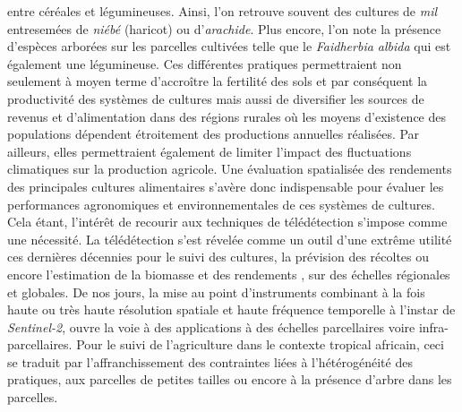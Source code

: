 entre céréales et légumineuses. Ainsi, l'on retrouve souvent des cultures de \emph{mil} entresemées de \emph{niébé} (haricot) ou d'\emph{arachide}. Plus encore, l'on note la 
présence d'espèces arborées sur les parcelles cultivées telle que le \emph{Faidherbia albida} qui est également une légumineuse. Ces différentes pratiques permettraient non seulement à moyen terme d’accroître la fertilité des 
sols et par conséquent la productivité des systèmes de cultures mais aussi de diversifier les sources de revenus et d’alimentation dans des régions rurales où les moyens d’existence
des populations dépendent étroitement des productions annuelles réalisées. Par ailleurs, elles permettraient également de limiter l’impact des fluctuations climatiques sur la 
production agricole. Une évaluation spatialisée des rendements des principales cultures alimentaires s'avère donc indispensable pour évaluer les performances agronomiques et 
environnementales de ces systèmes de cultures. Cela étant, l’intérêt de recourir aux techniques de télédétection s’impose comme une nécessité. La télédétection s’est révelée comme un outil d’une extrême utilité ces dernières décennies pour le suivi des cultures, la prévision des récoltes ou encore l'estimation de la biomasse et des rendements \citep{Kogan2013,Johnson2014,Leroux2016,Battude2016,Sibley2014a}, sur des échelles régionales et 
globales. De nos jours, la mise au point d'instruments combinant à la fois haute ou très haute résolution spatiale et haute fréquence temporelle à l'instar de \emph{Sentinel-2}, ouvre la
voie à des applications à des échelles parcellaires voire infra-parcellaires. Pour le suivi de l'agriculture dans le contexte tropical africain, ceci se traduit par l'affranchissement des contraintes liées à 
l'hétérogénéité des pratiques, aux parcelles de petites tailles ou encore à la présence d’arbre dans les parcelles.
